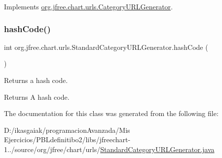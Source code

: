 Implements \mbox{\hyperlink{interfaceorg_1_1jfree_1_1chart_1_1urls_1_1_category_u_r_l_generator_a79085c43a3cdca05ab0bc3cfd8901727}{org.\+jfree.\+chart.\+urls.\+Category\+U\+R\+L\+Generator}}.

\mbox{\label{classorg_1_1jfree_1_1chart_1_1urls_1_1_standard_category_u_r_l_generator_a68b3a2814d60f264fe067cdc2c49cbf1}} 
\subsubsection{\texorpdfstring{hash\+Code()}{hashCode()}}
{\footnotesize\ttfamily int org.\+jfree.\+chart.\+urls.\+Standard\+Category\+U\+R\+L\+Generator.\+hash\+Code (\begin{DoxyParamCaption}{ }\end{DoxyParamCaption})}

Returns a hash code.

\begin{DoxyReturn}{Returns}
A hash code. 
\end{DoxyReturn}


The documentation for this class was generated from the following file\+:\begin{DoxyCompactItemize}
\item 
D\+:/ikasgaiak/programacion\+Avanzada/\+Mis Ejercicios/\+P\+B\+Ldefinitibo2/libs/jfreechart-\/1../source/org/jfree/chart/urls/\mbox{\hyperlink{_standard_category_u_r_l_generator_8java}{Standard\+Category\+U\+R\+L\+Generator.\+java}}\end{DoxyCompactItemize}
